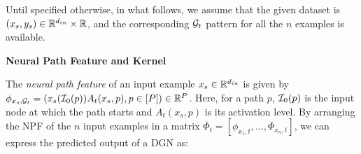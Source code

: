 Until specified otherwise, in what follows, we assume that the given dataset is $(x_s,y_s)\in\mathbb{R}^{d_{in}}\times \mathbb{R}$, and the corresponding $\mathcal{G}_t$ pattern for all the $n$ examples is available. 
\begin{center}
\textbf{Neural Path Feature and Kernel}
\end{center}
The \emph{neural path feature} of an input example $x_s\in \mathbb{R}^{d_{in}}$ is given by $\phi_{x_s,\mathcal{G}_t}=(x_s(\mathcal{I}_0(p))A_t(x_s,p) ,p\in[P])\in\mathbb{R}^P$. Here, for a path $p$, $\mathcal{I}_0(p)$ is the input node at which the path starts and $A_t(x_s,p)$ is its activation level. By arranging the NPF of the $n$ input examples in a matrix $\Phi_t=\left[\phi_{x_1,t},\ldots, \Phi_{x_n,t}\right]$, we can express the predicted output of a DGN as: 
